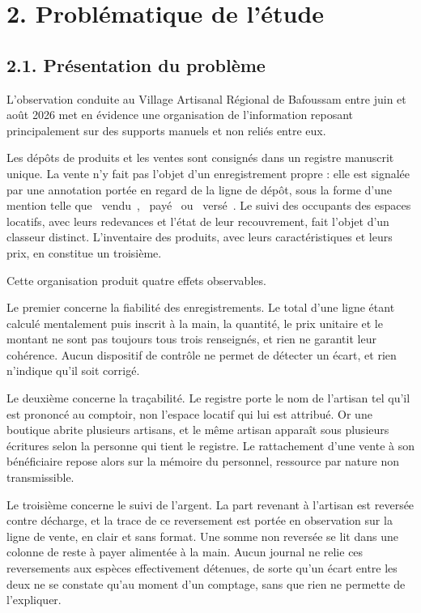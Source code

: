 \section*{2. Problématique de l'étude}

\subsection*{2.1. Présentation du problème}

L'observation conduite au Village Artisanal Régional de Bafoussam entre juin et août 2026 met en évidence une organisation de l'information reposant principalement sur des supports manuels et non reliés entre eux.

Les dépôts de produits et les ventes sont consignés dans un registre manuscrit unique. La vente n'y fait pas l'objet d'un enregistrement propre : elle est signalée par une annotation portée en regard de la ligne de dépôt, sous la forme d'une mention telle que \guillemotleft~vendu~\guillemotright, \guillemotleft~payé~\guillemotright{} ou \guillemotleft~versé~\guillemotright. Le suivi des occupants des espaces locatifs, avec leurs redevances et l'état de leur recouvrement, fait l'objet d'un classeur distinct. L'inventaire des produits, avec leurs caractéristiques et leurs prix, en constitue un troisième.

Cette organisation produit quatre effets observables.

Le premier concerne la fiabilité des enregistrements. Le total d'une ligne étant calculé mentalement puis inscrit à la main, la quantité, le prix unitaire et le montant ne sont pas toujours tous trois renseignés, et rien ne garantit leur cohérence. Aucun dispositif de contrôle ne permet de détecter un écart, et rien n'indique qu'il soit corrigé.

Le deuxième concerne la traçabilité. Le registre porte le nom de l'artisan tel qu'il est prononcé au comptoir, non l'espace locatif qui lui est attribué. Or une boutique abrite plusieurs artisans, et le même artisan apparaît sous plusieurs écritures selon la personne qui tient le registre. Le rattachement d'une vente à son bénéficiaire repose alors sur la mémoire du personnel, ressource par nature non transmissible.

Le troisième concerne le suivi de l'argent. La part revenant à l'artisan est reversée contre décharge, et la trace de ce reversement est portée en observation sur la ligne de vente, en clair et sans format. Une somme non reversée se lit dans une colonne de reste à payer alimentée à la main. Aucun journal ne relie ces reversements aux espèces effectivement détenues, de sorte qu'un écart entre les deux ne se constate qu'au moment d'un comptage, sans que rien ne permette de l'expliquer.

